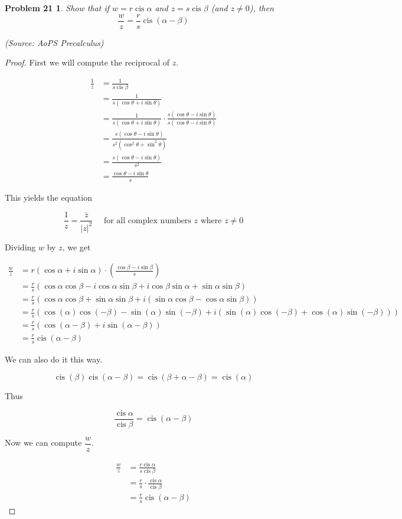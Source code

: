 \documentclass{article}
\DeclareMathOperator\cis{cis}
\newtheorem*{theorem}{Problem 21}
\begin{document}
\begin{theorem}
Show that if $w = r \cis \alpha$ and $z = s \cis \beta$ (and $z \neq 0$), then $$\frac{w}{z}= \frac{r}{s} \cis (\alpha - \beta)$$

(Source: AoPS Precalculus)
\end{theorem}

\begin{proof}
First we will compute the reciprocal of $z$.

\begin{align*}
\frac{1}{z} &= \frac{1}{s \cis \beta} \\
&= \frac{1}{s(\cos \theta + i \sin \theta)} \\
&= \frac{1}{s(\cos \theta + i \sin \theta)} \cdot \frac{s(\cos \theta - i \sin \theta)}{s(\cos \theta - i \sin \theta)} \\
&= \frac{s(\cos \theta - i \sin \theta)}{s^2(\cos^2 \theta + \sin^2 \theta)} \\
&= \frac{s(\cos \theta - i \sin \theta)}{s^2} \\
&= \frac{\cos \theta - i \sin \theta}{s}
\end{align*}

This yields the equation

$$ \frac{1}{z} = \frac{\overline{z}}{|z|^2} \quad \text{ for all complex numbers $z$ where } z \neq 0 $$

Dividing $w$ by $z$, we get

\begin{align*}
\frac{w}{z} &= r(\cos \alpha + i \sin \alpha) \cdot \left(\frac{\cos \beta - i \sin \beta}{s}\right) \\
&= \frac{r}{s} (\cos \alpha \cos \beta - i \cos \alpha \sin \beta + i \cos \beta \sin \alpha + \sin \alpha \sin \beta) \\
&= \frac{r}{s} (\cos \alpha \cos \beta + \sin \alpha \sin \beta + i (\sin \alpha \cos \beta - \cos \alpha \sin \beta)) \\
&= \frac{r}{s} (\cos (\alpha) \cos (-\beta) - \sin (\alpha) \sin (-\beta) + i (\sin (\alpha) \cos (-\beta) + \cos (\alpha) \sin (-\beta))) \\
&= \frac{r}{s} (\cos (\alpha - \beta) + i \sin (\alpha - \beta)) \\
&= \boxed{\frac{r}{s} \cis (\alpha - \beta)}
\end{align*}

We can also do it this way.

$$ \cis(\beta) \cis(\alpha - \beta) = \cis(\beta + \alpha - \beta) = \cis(\alpha) $$

Thus

$$ \frac{\cis \alpha}{\cis \beta} = \cis(\alpha - \beta) $$

Now we can compute $\dfrac{w}{z}$.

\begin{align*}
\frac{w}{z} &= \frac{r \cis \alpha}{s \cis \beta} \\
&= \frac{r}{s} \cdot \frac{\cis \alpha}{\cis \beta} \\
&= \boxed{\frac{r}{s} \cis(\alpha - \beta)}
\end{align*}
\end{proof}
\end{document}
